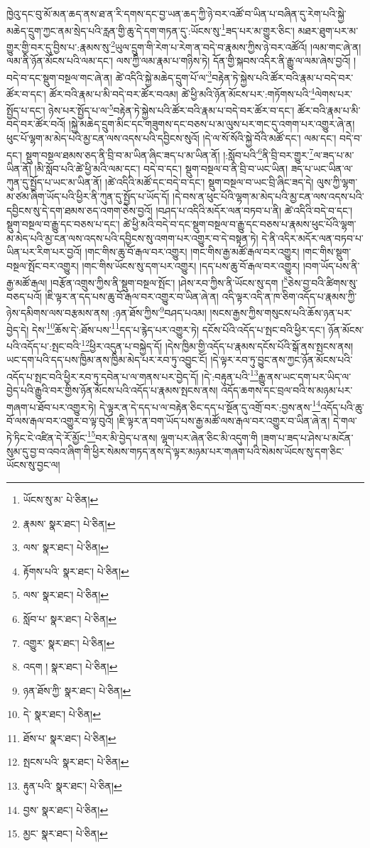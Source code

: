 ཁྱེའུ་དང་བུ་མོ་མན་ཆད་ནས་ཐ་ན་རི་དགས་དང་བྱ་ཡན་ཆད་ཀྱི་ཉེ་བར་འཚོ་བ་ཡིན་པ་བཞིན་དུ་རེག་པའི་སྐྱེ་མཆེད་དྲུག་ཀྱང་ནམ་སྲེད་པའི་རླན་གྱི་ཆུ་དེ་དག་གཏན་དུ་:ཡོངས་སུ་\footnote{ཡོངས་སུ་མ་  པེ་ཅིན། }ཟད་པར་མ་གྱུར་ཅིང་། མཐར་ཐུག་པར་མ་གྱུར་གྱི་བར་དུ་བྱིས་པ་:རྣམས་སུ་\footnote{རྣམས་  སྣར་ཐང་།  པེ་ཅིན། }ཡུལ་དྲུག་གི་རེག་པ་རེག་ན་བདེ་བ་རྣམས་ཀྱིས་ཉེ་བར་འཚོའོ། །ལམ་གང་ཞེ་ན། ལམ་ནི་ཉོན་མོངས་པའི་ལམ་དང་། ལས་ཀྱི་ལམ་རྣམ་པ་གཉིས་ཏེ། དོན་གྱི་སྐབས་འདིར་ནི་རྒྱུ་ལ་ལམ་ཞེས་བྱའོ། །བདེ་བ་དང་སྡུག་བསྔལ་གང་ཞེ་ན། ཚེ་འདིའི་སྐྱེ་མཆེད་དྲུག་པོ་ལ་\footnote{ལས་  སྣར་ཐང་།  པེ་ཅིན། }བརྟེན་ཏེ་སྐྱེས་པའི་ཚོར་བའི་རྣམ་པ་བདེ་བར་ཚོར་བ་དང་། ཚོར་བའི་རྣམ་པ་མི་བདེ་བར་ཚོར་བའམ། ཚེ་ཕྱི་མའི་ཉོན་མོངས་པར་:གཏོགས་པའི་\footnote{རྟོགས་པའི་  སྣར་ཐང་།  པེ་ཅིན། }ལེགས་པར་སྤྱོད་པ་དང་། ཉེས་པར་སྤྱོད་པ་ལ་\footnote{ལས་  སྣར་ཐང་།  པེ་ཅིན། }བརྟེན་ཏེ་སྐྱེས་པའི་ཚོར་བའི་རྣམ་པ་བདེ་བར་ཚོར་བ་དང་། ཚོར་བའི་རྣམ་པ་མི་བདེ་བར་ཚོར་བའོ། །སྐྱེ་མཆེད་དྲུག་མིང་དང་གཟུགས་དང་བཅས་པ་མ་ལུས་པར་གང་དུ་འགག་པར་འགྱུར་ཞེ་ན། ཕུང་པོ་ལྷག་མ་མེད་པའི་མྱ་ངན་ལས་འདས་པའི་དབྱིངས་སུའོ། །དེ་ལ་སོ་སོའི་སྐྱེ་བོའི་མཚོ་དང་། ལམ་དང་། བདེ་བ་དང་། སྡུག་བསྔལ་ཐམས་ཅད་ནི་བྲི་བ་མ་ཡིན་ཞིང་ཟད་པ་མ་ཡིན་ནོ། །:སློབ་པའི་\footnote{སློབ་པ་  སྣར་ཐང་།  པེ་ཅིན། }ནི་བྲི་བར་གྱུར་\footnote{འགྱུར་  སྣར་ཐང་།  པེ་ཅིན། }ལ་ཟད་པ་མ་ཡིན་ནོ། །མི་སློབ་པའི་ཚེ་ཕྱི་མའི་ལམ་དང་། བདེ་བ་དང་། སྡུག་བསྔལ་བ་ནི་བྲི་བ་ཡང་ཡིན། ཟད་པ་ཡང་ཡིན་ལ་ཀུན་དུ་སྤྱོད་པ་ཡང་མ་ཡིན་ནོ། །ཚེ་འདིའི་མཚོ་དང་བདེ་བ་དང་། སྡུག་བསྔལ་བ་ཡང་བྲི་ཞིང་ཟད་དེ། ལུས་ཀྱི་ལྷག་མ་ཙམ་ཞིག་ཡོད་པའི་ཕྱིར་ནི་ཀུན་དུ་སྤྱོད་པ་ཡོད་དོ། །དེ་བས་ན་ཕུང་པོའི་ལྷག་མ་མེད་པའི་མྱ་ངན་ལས་འདས་པའི་དབྱིངས་སུ་དེ་དག་ཐམས་ཅད་འགག་ཅེས་བྱའོ། །བཤད་པ་འདིའི་མདོར་ལན་བཏབ་པ་ནི། ཚེ་འདིའི་བདེ་བ་དང་། སྡུག་བསྔལ་བ་རྒྱུ་དང་བཅས་པ་དང་། ཚེ་ཕྱི་མའི་བདེ་བ་དང་སྡུག་བསྔལ་བ་རྒྱུ་དང་བཅས་པ་རྣམས་ཕུང་པོའི་ལྷག་མ་མེད་པའི་མྱ་ངན་ལས་འདས་པའི་དབྱིངས་སུ་འགག་པར་འགྱུར་བ་དེ་བསྟན་ཏེ། དེ་ནི་འདིར་མདོར་ལན་བཏབ་པ་ཡིན་པར་རིག་པར་བྱའོ། །གང་གིས་ཆུ་བོ་རྒལ་བར་འགྱུར། །གང་གིས་རྒྱ་མཚོ་རྒལ་བར་འགྱུར། །གང་གིས་སྡུག་བསྔལ་སྤོང་བར་འགྱུར། །གང་གིས་ཡོངས་སུ་དག་པར་འགྱུར། །དད་པས་ཆུ་བོ་རྒལ་བར་འགྱུར། །བག་ཡོད་པས་ནི་རྒྱ་མཚོ་རྒལ། །བརྩོན་འགྲུས་ཀྱིས་ནི་སྡུག་བསྔལ་སྤོང་། །ཤེས་རབ་ཀྱིས་ནི་ཡོངས་སུ་དག །\footnote{འདག །  སྣར་ཐང་།  པེ་ཅིན། }ཅེས་བྱ་བའི་ཚིགས་སུ་བཅད་པའོ། །ཇི་ལྟར་ན་དད་པས་ཆུ་བོ་རྒལ་བར་འགྱུར་བ་ཡིན་ཞེ་ན། འདི་ལྟར་འདི་ན་ཁ་ཅིག་འདོད་པ་རྣམས་ཀྱི་ཉེས་དམིགས་ལས་བརྩམས་ནས། :ཉན་ཐོས་ཀྱིས་\footnote{ཉན་ཐོས་ཀྱི་  སྣར་ཐང་།  པེ་ཅིན། }བཤད་པའམ། །སངས་རྒྱས་ཀྱིས་གསུངས་པའི་ཆོས་ཉན་པར་བྱེད་དེ། དེས་\footnote{དེ་  སྣར་ཐང་།  པེ་ཅིན། }ཆོས་དེ་:ཐོས་པས་\footnote{ཐོས་པ་  སྣར་ཐང་།  པེ་ཅིན། }དད་པ་རྙེད་པར་འགྱུར་ཏེ། དངོས་པོའི་འདོད་པ་སྤང་བའི་ཕྱིར་དང་། ཉོན་མོངས་པའི་འདོད་པ་:སྤང་བའི་\footnote{སྤངས་པའི་  སྣར་ཐང་།  པེ་ཅིན། }ཕྱིར་འདུན་པ་བསྐྱེད་དོ། །དེས་ཁྱིམ་གྱི་འདོད་པ་རྣམས་དངོས་པོའི་སྒོ་ནས་སྤངས་ནས། ཡང་དག་པའི་དད་པས་ཁྱིམ་ནས་ཁྱིམ་མེད་པར་རབ་ཏུ་འབྱུང་ངོ། །དེ་ལྟར་རབ་ཏུ་བྱུང་ནས་ཀྱང་ཉོན་མོངས་པའི་འདོད་པ་སྤང་བའི་ཕྱིར་རབ་ཏུ་དབེན་པ་ལ་གནས་པར་བྱེད་དོ། །དེ་:བརྟུན་པའི་\footnote{རྟུན་པའི་  སྣར་ཐང་།  པེ་ཅིན། }རྒྱུ་ནས་ཡང་དག་པར་ཡིད་ལ་བྱེད་པའི་རྒྱུའི་བར་གྱིས་ཉོན་མོངས་པའི་འདོད་པ་རྣམས་སྤངས་ནས། འདོད་ཆགས་དང་བྲལ་བའི་ས་མཉམ་པར་གཞག་པ་ཐོབ་པར་འགྱུར་ཏེ། དེ་ལྟར་ན་དེ་དད་པ་ལ་བརྟེན་ཅིང་དད་པ་སྔོན་དུ་འགྲོ་བར་:བྱས་ནས་\footnote{བྱས་  སྣར་ཐང་།  པེ་ཅིན། }འདོད་པའི་ཆུ་བོ་ལས་རྒལ་བར་འགྱུར་བ་ལྟ་བུའོ། །ཇི་ལྟར་ན་བག་ཡོད་པས་རྒྱ་མཚོ་ལས་རྒལ་བར་འགྱུར་བ་ཡིན་ཞེ་ན། དེ་གལ་ཏེ་ཏིང་ངེ་འཛིན་དེ་རོ་མྱོང་\footnote{མྱང་  སྣར་ཐང་།  པེ་ཅིན། }བར་མི་བྱེད་པ་ནས། ལྷག་པར་ཞེན་ཅིང་མི་འདུག་གི །ཟག་པ་ཟད་པ་ཤེས་པ་མངོན་སུམ་དུ་བྱ་བ་འབའ་ཞིག་གི་ཕྱིར་སེམས་གཏད་ནས་དེ་ལྟར་མཉམ་པར་གཞག་པའི་སེམས་ཡོངས་སུ་དག་ཅིང་ཡོངས་སུ་བྱང་ལ། 